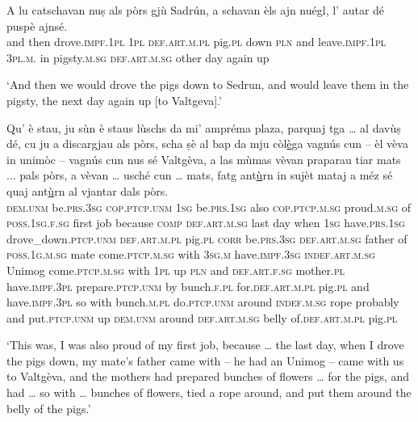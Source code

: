 \begin{linenumbers}
	\gll    A lu catschavan nuṣ als pòrs gjù Sadrún, a schavan èls ajn nuégl, l’ autar dé puspè ajnsé.\\
	and then drove.\textsc{impf.1pl}  \textsc{1pl}  \textsc{def.art.m.pl}  pig.\textsc{pl} down  \textsc{pln} and leave.\textsc{impf.1pl} \textsc{3pl.m.} in pigsty.\textsc{m.sg} \textsc{def.art.m.sg} other day again up\\
\end{linenumbers}
\medskip
\glt `And then we would drove the pigs down to Sedrun, and would leave them in the pigsty, the next day again up [to Valtgeva].'
\medskip


\begin{linenumbers}
	\gll    Qu’ è stau, ju sùn è staus lùschs da mi’ ampréma plaza, parquaj tga … al davùṣ dé, cu ju a discargjau als pòrs, scha ṣè al bap da mju còl\underline{è}ga vagnús cun – èl vèva in unimòc – vagnús cun nus sé Valtgèva, a las mùmas vèvan praparau tiar mats ...\footnotemark{} pals pòrs, a vèvan … usché cun … mats, fatg ant\underline{ù}rn in sujèt mataj a méz sé quaj ant\underline{ù}rn al vjantar dals pòrs.\\
	\textsc{dem.unm} be.\textsc{prs.3sg}  \textsc{cop.ptcp.unm} \textsc{1sg}  be.\textsc{prs.1sg} also \textsc{cop.ptcp.m.sg} proud.\textsc{m.sg} of  \textsc{poss.1sg.f.sg} first job because \textsc{comp} {} \textsc{def.art.m.sg} last day when \textsc{1sg} have.\textsc{prs.1sg}  drove\_down.\textsc{ptcp.unm} \textsc{def.art.m.pl} pig.\textsc{pl} \textsc{corr} be.\textsc{prs.3sg}  \textsc{def.art.m.sg} father of  \textsc{poss.1g.m.sg} mate come.\textsc{ptcp.m.sg} with {} \textsc{3sg.m} have.\textsc{impf.3sg}  \textsc{indef.art.m.sg} Unimog {} come.\textsc{ptcp.m.sg} with \textsc{1pl} up \textsc{pln} and \textsc{def.art.f.sg} mother.\textsc{pl} have.\textsc{impf.3pl}  prepare.\textsc{ptcp.unm} by bunch.\textsc{f.pl} {} for.\textsc{def.art.m.pl} pig.\textsc{pl} and have.\textsc{impf.3pl} {} so with {} bunch.\textsc{m.pl}  do.\textsc{ptcp.unm} around \textsc{indef.m.sg} rope probably and put.\textsc{ptcp.unm} up  \textsc{dem.unm} around \textsc{def.art.m.sg} belly of.\textsc{def.art.m.pl} pig.\textsc{pl} \\
\end{linenumbers}
\medskip
\glt `This was, I was also proud of my first job, because … the last day, when I drove the pigs down, my mate’s father came with – he had an Unimog – came with us to Valtgèva, and the mothers had prepared bunches of flowers … for the pigs, and had … so with … bunches of flowers, tied a rope around, and put them around the belly of the pigs.'
\medskip

